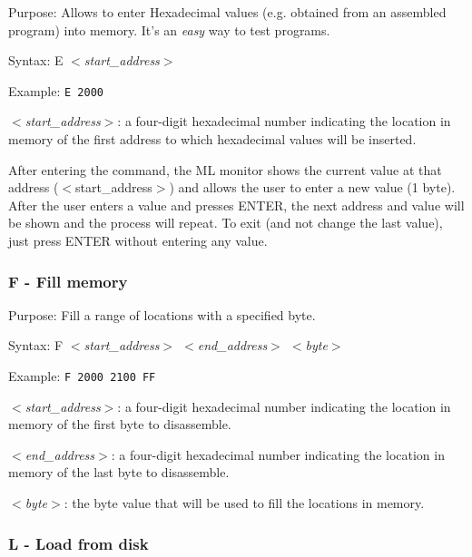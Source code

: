         Purpose:  Allows to enter Hexadecimal values (e.g. obtained from an
        assembled program) into memory. It's an \textit{easy} way to test
        programs.

        Syntax: E \textit{$<$start\_address$>$}

        Example: \texttt{E 2000}

        \hspace{1cm}\textit{$<$start\_address$>$}: a four-digit hexadecimal
        number indicating the location in memory of the first address to which
        hexadecimal values will be inserted.

        After entering the command, the ML monitor shows the current value at
        that address ($<$start\_address$>$) and allows the user to enter a new
        value (1 byte). After the user enters a value and presses ENTER, the
        next address and value will be shown and the process will repeat.
        To exit (and not change the last value), just press ENTER without
        entering any value.

        \subsubsection{F - Fill memory}

        Purpose: Fill a range of locations with a specified byte.

        Syntax: F \textit{$<$start\_address$>$ $<$end\_address$>$ $<$byte$>$}

        Example: \texttt{F 2000 2100 FF}

        \hspace{1cm}\textit{$<$start\_address$>$}: a four-digit hexadecimal
        number indicating the location in memory of the first byte to
        disassemble.

        \hspace{1cm}\textit{$<$end\_address$>$}: a four-digit hexadecimal
        number indicating the location in memory of the last byte to
        disassemble.

        \hspace{1cm}\textit{$<$byte$>$}: the byte value that will be used to
        fill the locations in memory.

        \subsubsection{L - Load from disk}

